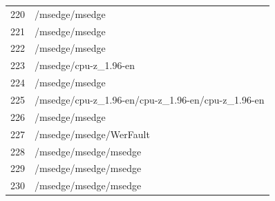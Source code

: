 \documentclass[a4paper,twoside,12pt]{book}
\begin{document}
\begin{appendices}
\begin{table}
\begin{tabular}{ll}
		220 &                                     /msedge/msedge \\
		221 &                                     /msedge/msedge \\
		222 &                                     /msedge/msedge \\
		223 &                              /msedge/cpu-z\_1.96-en \\
		224 &                                     /msedge/msedge \\
		225 &  /msedge/cpu-z\_1.96-en/cpu-z\_1.96-en/cpu-z\_1.96-en \\
		226 &                                     /msedge/msedge \\
		227 &                            /msedge/msedge/WerFault \\
		228 &                              /msedge/msedge/msedge \\
		229 &                              /msedge/msedge/msedge \\
		230 &                              /msedge/msedge/msedge \\
		\bottomrule
	\end{tabular}
\end{table}



\end{appendices}
\end{document}
